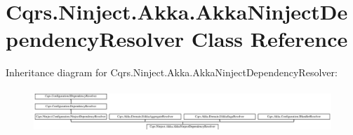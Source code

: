 \hypertarget{classCqrs_1_1Ninject_1_1Akka_1_1AkkaNinjectDependencyResolver}{}\section{Cqrs.\+Ninject.\+Akka.\+Akka\+Ninject\+Dependency\+Resolver Class Reference}
\label{classCqrs_1_1Ninject_1_1Akka_1_1AkkaNinjectDependencyResolver}
Inheritance diagram for Cqrs.\+Ninject.\+Akka.\+Akka\+Ninject\+Dependency\+Resolver\+:\begin{figure}[H]
\begin{center}
\leavevmode
\includegraphics[height=1.676647cm]{classCqrs_1_1Ninject_1_1Akka_1_1AkkaNinjectDependencyResolver}
\end{center}
\end{figure}
